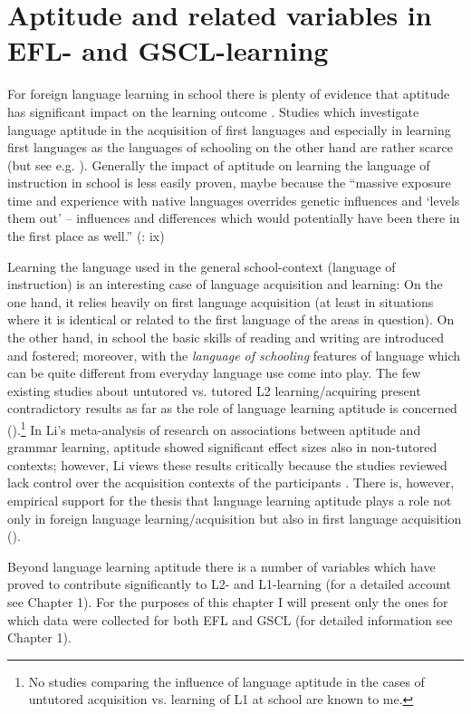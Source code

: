 \documentclass[output=paper]{langsci/langscibook}
\begin{document}
\section{Aptitude and related variables in EFL- and GSCL-learning}

For foreign language learning in school there is plenty of evidence that aptitude has significant impact on the learning outcome \citep{Li2015}. Studies which investigate language aptitude in the acquisition of first languages and especially in learning first languages as the languages of schooling on the other hand are rather scarce (but see e.g. \citealt{SkehanDucroquet1988}). Generally the impact of aptitude on learning the language of instruction in school is less easily proven, maybe because the “massive exposure time and experience with native languages overrides genetic influences and ‘levels them out' – influences and differences which would potentially have been there in the first place as well.” (\citealt{Reiterer2018}: ix)

Learning the language used in the general school-context (language of instruction) is an interesting case of language acquisition and learning: On the one hand, it relies heavily on first language acquisition (at least in situations where it is identical or related to the first language of the areas in question). On the other hand, in school the basic skills of reading and writing are introduced and fostered; moreover, with the \textit{language of schooling} \citep{Schleppegrell2004} features of language which can be quite different from everyday language use come into play. The few existing studies about untutored vs. tutored L2 learning/acquiring present contradictory results as far as the role of language learning aptitude is concerned (\citealt{UdryEtAl2019}).\footnote{No studies comparing the influence of language aptitude in the cases of untutored acquisition vs. learning of L1 at school are known to me.} In Li’s meta-analysis of research on associations between aptitude and grammar learning, aptitude showed significant effect sizes also in non-tutored contexts; however, Li views these results critically because the studies reviewed lack control over the acquisition contexts of the participants \citep[405]{Li2015}. There is, however, empirical support for the thesis that language learning aptitude plays a role not only in foreign language learning/acquisition but also in first language acquisition (\citealt{BiedronPawlak2016}).

Beyond language learning aptitude there is a number of variables which have proved to contribute significantly to L2- and L1-learning (for a detailed account see Chapter 1). For the purposes of this chapter I will present only the ones for which data were collected for both EFL and GSCL (for detailed information see Chapter 1).
\end{document}
